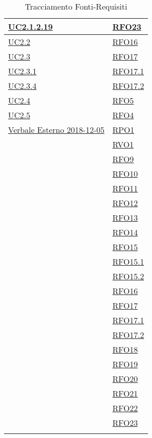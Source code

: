 \begin{longtable}{|>{\centering}m{5cm}|m{5cm}<{\centering}|}
	\hyperref[UC2.1.2.19]{UC2.1.2.19} & \hyperlink{RFO23}{RFO23}\\ \hline
	\hyperref[UC2.2]{UC2.2} & \hyperlink{RFO16}{RFO16}\\ \hline
	\hyperref[UC2.3]{UC2.3} & \hyperlink{RFO17}{RFO17}\\ \hline
	\hyperref[UC2.3.1]{UC2.3.1} & \hyperlink{RFO17.1}{RFO17.1}\\ \hline
	\hyperref[UC2.3.4]{UC2.3.4} & \hyperlink{RFO17.2}{RFO17.2}\\ \hline
	\hyperref[UC2.4]{UC2.4} & \hyperlink{RFO5}{RFO5}\\ \hline
	\hyperref[UC2.5]{UC2.5} & \hyperlink{RFO4}{RFO4}\\ \hline
	\hyperlink{Verbale Esterno 2018-12-05}{Verbale Esterno 2018-12-05} &
	\hyperlink{RPO1}{RPO1}\\ & \hyperlink{RVO1}{RVO1}\\ & \hyperlink{RFO9}{RFO9}\\ & \hyperlink{RFO10}{RFO10}\\ & \hyperlink{RFO11}{RFO11}\\ & \hyperlink{RFO12}{RFO12}\\ & \hyperlink{RFO13}{RFO13}\\ & \hyperlink{RFO14}{RFO14}\\ & \hyperlink{RFO15}{RFO15}\\ & \hyperlink{RFO15.1}{RFO15.1}\\ & \hyperlink{RFO15.2}{RFO15.2}\\ & \hyperlink{RFO16}{RFO16}\\ & \hyperlink{RFO17}{RFO17}\\ & \hyperlink{RFO17.1}{RFO17.1}\\ & 
	\hyperlink{RFO17.2}{RFO17.2}\\ & \hyperlink{RFO18}{RFO18}\\ & \hyperlink{RFO19}{RFO19}\\ & \hyperlink{RFO20}{RFO20}\\ & \hyperlink{RFO21}{RFO21}\\ & \hyperlink{RFO22}{RFO22}\\ & \hyperlink{RFO23}{RFO23}\\ \hline
	\caption[Tracciamento Fonti-Requisiti]{Tracciamento Fonti-Requisiti}
	\label{tabella:fonti-requi}
\end{longtable}
\clearpage

